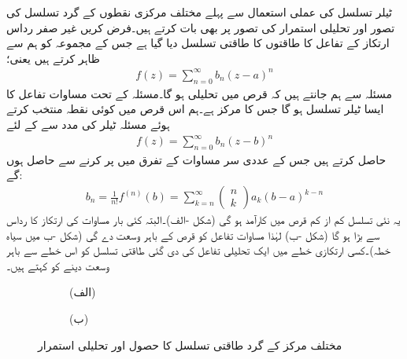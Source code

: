 ٹیلر تسلسل کی عملی استعمال سے پہلے مختلف مرکزی نقطوں کے گرد تسلسل کی تصور  اور تحلیلی استمرار کی تصور  پر بھی بات کرتے ہیں۔فرض کریں غیر صفر رداس ارتکاز  کے تفاعل  کا  طاقتوں کا طاقتی تسلسل  دیا گیا ہے جس کے مجموعہ کو ہم  سے ظاہر کرتے ہیں یعنی؛
\begin{align}\label{مساوات_ٹیلر_دیا_گیا_الف}
f(z)=\sum\limits_{n=0}^{\infty} b_n(z-a)^n
\end{align}
مسئلہ  سے ہم جانتے ہیں کہ  قرص  میں  تحلیلی ہو گا۔مسئلہ  کے تحت مساوات  تفاعل  کا ایسا ٹیلر تسلسل ہو گا جس کا مرکز  ہے۔ہم اس قرص میں کوئی نقطہ  منتخب کرتے ہوئے مسئلہ ٹیلر کی مدد سے   کے لئے 
\begin{align}\label{مساوات_ٹیلر_دیا_گیا_ب}
f(z)=\sum\limits_{n=0}^{\infty} b_n(z-b)^n
\end{align}
حاصل کرتے ہیں جس کے عددی سر  مساوات  کے تفرق میں  پر کرنے سے حاصل ہوں گے:
\begin{align*}
b_n=\frac{1}{n!}f^{(n)}(b)=\sum\limits_{k=n}^{\infty} \begin{pmatrix} n\\k\end{pmatrix} a_k (b-a)^{k-n}
\end{align*}
یہ نئی تسلسل کم از کم قرص  میں کارآمد ہو گی (شکل -الف)۔البتہ کئی بار مساوات  کی ارتکاز کا رداس  سے بڑا ہو گا  (شکل -ب) لہٰذا  مساوات  تفاعل  کو  قرص  کے باہر وسعت دے گی (شکل -ب میں سیاہ خطہ)۔کسی ارتکازی خطے میں ایک تحلیلی تفاعل کی دی گئی طاقتی تسلسل  کو اس خطے سے باہر وسعت دینے کو  کہتے ہیں۔
\begin{figure}
\centering
\begin{subfigure}{0.5\textwidth}
\centering
{}
\caption*{(الف)}
\end{subfigure}%
\begin{subfigure}{0.5\textwidth}
\centering
{}
\caption*{(ب)}
\end{subfigure}%
\caption{مختلف مرکز کے گرد طاقتی تسلسل کا حصول اور تحلیلی استمرار}
\label{شکل_ٹیلر_مختلف_مرکز_تسلسل}
\end{figure}

